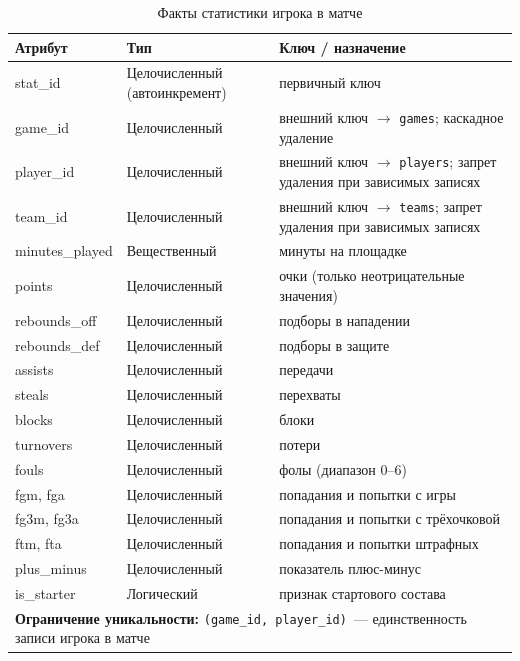 {\begin{table}[H]
\caption{Факты статистики игрока в матче}
\label{tab:gps}
\centering
\begin{tabular}{|p{}|p{}|p{}|}
\hline
\textbf{Атрибут} & \textbf{Тип} & \textbf{Ключ / назначение} \\
\hline
stat\_id & Целочисленный (автоинкремент) & первичный ключ \\
\hline
game\_id & Целочисленный & внешний ключ $\rightarrow$ \texttt{games}; каскадное удаление \\
\hline
player\_id & Целочисленный & внешний ключ $\rightarrow$ \texttt{players}; запрет удаления при зависимых записях \\
\hline
team\_id & Целочисленный & внешний ключ $\rightarrow$ \texttt{teams}; запрет удаления при зависимых записях \\
\hline
minutes\_played & Вещественный & минуты на площадке \\
\hline
points & Целочисленный & очки (только неотрицательные значения) \\
\hline
rebounds\_off & Целочисленный & подборы в нападении \\
\hline
rebounds\_def & Целочисленный & подборы в защите \\
\hline
assists & Целочисленный & передачи \\
\hline
steals & Целочисленный & перехваты \\
\hline
blocks & Целочисленный & блоки \\
\hline
turnovers & Целочисленный & потери \\
\hline
fouls & Целочисленный & фолы (диапазон 0--6) \\
\hline
fgm, fga & Целочисленный & попадания и попытки с игры \\
\hline
fg3m, fg3a & Целочисленный & попадания и попытки с трёхочковой \\
\hline
ftm, fta & Целочисленный & попадания и попытки штрафных \\
\hline
plus\_minus & Целочисленный & показатель плюс-минус \\
\hline
is\_starter & Логический & признак стартового состава \\
\hline
\multicolumn{3}{|p{\dimexpr\textwidth-2\tabcolsep-2\arrayrulewidth\relax}|}{%
\textbf{Ограничение уникальности:} \texttt{(game\_id, player\_id)}~---
единственность записи игрока в матче} \\
\hline
\end{tabular}
\end{table}

} %

